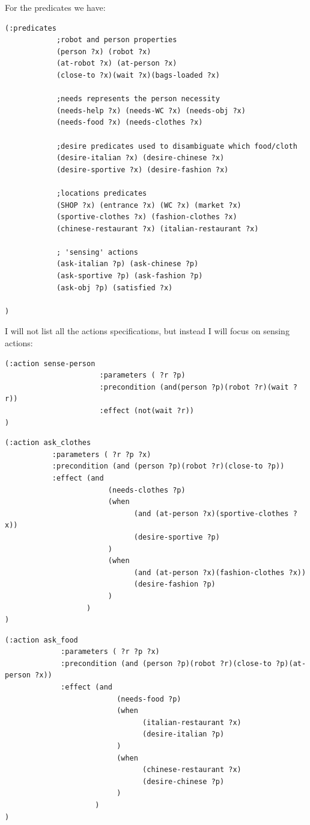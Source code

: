 \documentclass[pdftex,12pt,a4paper]{report}
\begin{document}
\noindent For the predicates we have:
\begin{verbatim}
(:predicates
            ;robot and person properties
            (person ?x) (robot ?x)
            (at-robot ?x) (at-person ?x)
            (close-to ?x)(wait ?x)(bags-loaded ?x)

            ;needs represents the person necessity
            (needs-help ?x) (needs-WC ?x) (needs-obj ?x)
            (needs-food ?x) (needs-clothes ?x)

            ;desire predicates used to disambiguate which food/cloth
            (desire-italian ?x) (desire-chinese ?x)
            (desire-sportive ?x) (desire-fashion ?x)

            ;locations predicates
            (SHOP ?x) (entrance ?x) (WC ?x) (market ?x)
            (sportive-clothes ?x) (fashion-clothes ?x)
            (chinese-restaurant ?x) (italian-restaurant ?x)

            ; 'sensing' actions
            (ask-italian ?p) (ask-chinese ?p)
            (ask-sportive ?p) (ask-fashion ?p)
            (ask-obj ?p) (satisfied ?x)

)
\end{verbatim}

\noindent I will not list all the actions specifications, but instead I will focus on sensing actions:
\begin{verbatim}
(:action sense-person
                      :parameters ( ?r ?p)
                      :precondition (and(person ?p)(robot ?r)(wait ?r))
                      :effect (not(wait ?r))
)
\end{verbatim}

\begin{verbatim}
(:action ask_clothes
           :parameters ( ?r ?p ?x)
           :precondition (and (person ?p)(robot ?r)(close-to ?p))
           :effect (and
                        (needs-clothes ?p)
                        (when
                              (and (at-person ?x)(sportive-clothes ?x))
                              (desire-sportive ?p)
                        )
                        (when
                              (and (at-person ?x)(fashion-clothes ?x))
                              (desire-fashion ?p)
                        )
                   )
)
\end{verbatim}

\begin{verbatim}
(:action ask_food
             :parameters ( ?r ?p ?x)
             :precondition (and (person ?p)(robot ?r)(close-to ?p)(at-person ?x))
             :effect (and
                          (needs-food ?p)
                          (when
                                (italian-restaurant ?x)
                                (desire-italian ?p)
                          )
                          (when
                                (chinese-restaurant ?x)
                                (desire-chinese ?p)
                          )
                     )
)
\end{verbatim}
\end{document}
